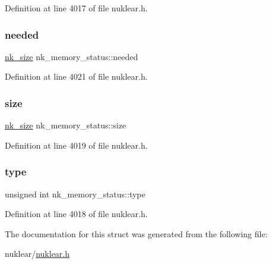Definition at line 4017 of file nuklear.\+h.

\mbox{\label{structnk__memory__status_a1dcfdb12316a8b864595d23839ef7072}} 
\subsubsection{\texorpdfstring{needed}{needed}}
{\footnotesize\ttfamily \mbox{\hyperlink{nuklear_8h_a84c0fc50dec5501be327b33d41d9010c}{nk\+\_\+size}} nk\+\_\+memory\+\_\+status\+::needed}



Definition at line 4021 of file nuklear.\+h.

\mbox{\label{structnk__memory__status_afff8181f79734681fbe2f240e866dae1}} 
\subsubsection{\texorpdfstring{size}{size}}
{\footnotesize\ttfamily \mbox{\hyperlink{nuklear_8h_a84c0fc50dec5501be327b33d41d9010c}{nk\+\_\+size}} nk\+\_\+memory\+\_\+status\+::size}



Definition at line 4019 of file nuklear.\+h.

\mbox{\label{structnk__memory__status_a68c5a40b0c4f683e78c64301f5ab319b}} 
\subsubsection{\texorpdfstring{type}{type}}
{\footnotesize\ttfamily unsigned int nk\+\_\+memory\+\_\+status\+::type}



Definition at line 4018 of file nuklear.\+h.



The documentation for this struct was generated from the following file\+:\begin{DoxyCompactItemize}
\item 
nuklear/\mbox{\hyperlink{nuklear_8h}{nuklear.\+h}}\end{DoxyCompactItemize}
